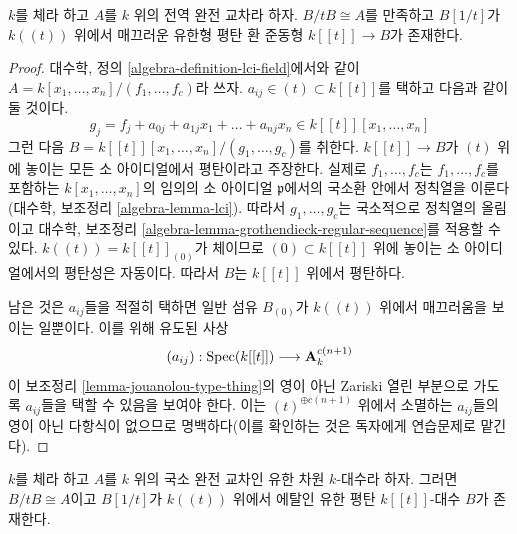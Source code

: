 \begin{lemma}
\label{lemma-smoothing-affine-lci}
$k$를 체라 하고 $A$를 $k$ 위의 전역 완전 교차라 하자. $B/tB \cong A$를
만족하고 $B[1/t]$가 $k((t))$ 위에서 매끄러운 유한형 평탄 환 준동형
$k[[t]] \to B$가 존재한다.
\end{lemma}

\begin{proof}
대수학, 정의 \ref{algebra-definition-lci-field}에서와 같이
$A = k[x_1, \ldots, x_n]/(f_1, \ldots, f_c)$라 쓰자.
$a_{ij} \in (t) \subset k[[t]]$를 택하고 다음과 같이 둘 것이다.
$$
g_j = f_j + a_{0j} + a_{1j}x_1 + \ldots + a_{nj}x_n \in
k[[t]][x_1, \ldots, x_n]
$$
그런 다음 $B = k[[t]][x_1, \ldots, x_n]/(g_1, \ldots, g_c)$를 취한다.
$k[[t]] \to B$가 $(t)$ 위에 놓이는 모든 소 아이디얼에서 평탄이라고
주장한다. 실제로 $f_1, \ldots, f_c$는 $f_1, \ldots, f_c$를 포함하는
$k[x_1, \ldots, x_n]$의 임의의 소 아이디얼 $\mathfrak p$에서의
국소환 안에서 정칙열을 이룬다(대수학, 보조정리
\ref{algebra-lemma-lci}). 따라서 $g_1, \ldots, g_c$는 국소적으로
정칙열의 올림이고 대수학, 보조정리
\ref{algebra-lemma-grothendieck-regular-sequence}를 적용할 수 있다.
$k((t)) = k[[t]]_{(0)}$가 체이므로 $(0) \subset k[[t]]$ 위에 놓이는
소 아이디얼에서의 평탄성은 자동이다. 따라서 $B$는 $k[[t]]$ 위에서
평탄하다.

\medskip\noindent
남은 것은 $a_{ij}$들을 적절히 택하면 일반 섬유 $B_{(0)}$가
$k((t))$ 위에서 매끄러움을 보이는 일뿐이다. 이를 위해 유도된 사상
$$
(a_{ij}) : \mathop{\mathrm{Spec}}(k[[t]]) \longrightarrow \mathbf{A}^{c(n + 1)}_k
$$
이 보조정리 \ref{lemma-jouanolou-type-thing}의 영이 아닌 Zariski 열린
부분으로 가도록 $a_{ij}$들을 택할 수 있음을 보여야 한다. 이는
$(t)^{\oplus c(n + 1)}$ 위에서 소멸하는 $a_{ij}$들의 영이 아닌 다항식이
없으므로 명백하다(이를 확인하는 것은 독자에게 연습문제로 맡긴다).
\end{proof}

\begin{lemma}
\label{lemma-smoothing-artinian-lci}
$k$를 체라 하고 $A$를 $k$ 위의 국소 완전 교차인 유한 차원
$k$-대수라 하자. 그러면 $B/tB \cong A$이고 $B[1/t]$가 $k((t))$ 위에서
에탈인 유한 평탄 $k[[t]]$-대수 $B$가 존재한다.
\end{lemma}

